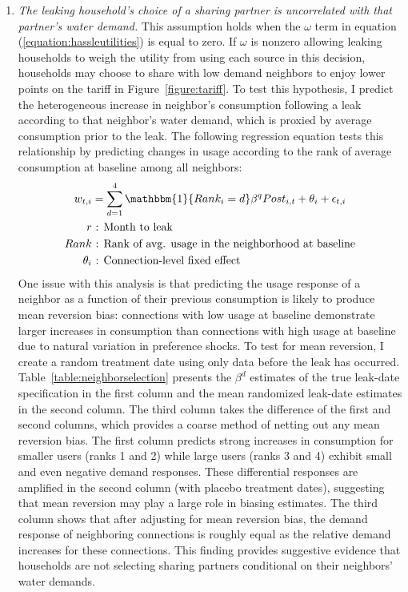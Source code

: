 \documentclass[12pt]{article}
\begin{document}
\begin{appendices}
\begin{enumerate}
	\item \textit{  The leaking household's choice of a sharing partner is uncorrelated with that partner's water demand.  }  This assumption holds when the $\omega$ term in equation (\ref{equation:hassleutilities}) is equal to zero.  If $\omega$ is nonzero allowing leaking households to weigh the utility from using each source in this decision, households may choose to share with low demand neighbors to enjoy lower points on the tariff in Figure~\ref{figure:tariff}.  To test this hypothesis, I predict the heterogeneous increase in neighbor's consumption following a leak according to that neighbor's water demand, which is proxied by average consumption prior to the leak.  The following regression equation tests this relationship by predicting changes in usage according to the rank of average consumption at baseline among all neighbors: 
\begin{align*}
	w_{t,i} &= \sum_{d=1}^{4} \mathbbm{1}\{Rank_{i}=d\}  \beta^{q} Post_{i,t}  + \theta_{i}  + \epsilon_{t,i}\\
r &\text{ : Month to leak} \\
Rank &\text{ : Rank of avg. usage in the neighborhood at baseline} \\
\theta_i &\text{ : Connection-level fixed effect}
\end{align*}
	One issue with this analysis is that predicting the usage response of a neighbor as a function of their previous consumption is likely to produce mean reversion bias: connections with low usage at baseline demonstrate larger increases in consumption than connections with high usage at baseline due to natural variation in preference shocks.  To test for mean reversion, I create a random treatment date using only data before the leak has occurred.  Table~\ref{table:neighborselection} presents the $\beta^{d}$ estimates of the true leak-date specification in the first column and the mean randomized leak-date estimates in the second column.  The third column takes the difference of the first and second columns, which provides a coarse method of netting out any mean reversion bias.  The first column predicts strong increases in consumption for smaller users (ranks 1 and 2) while large users (ranks 3 and 4) exhibit small and even negative demand responses.  These differential responses are amplified in the second column (with placebo treatment dates), suggesting that mean reversion may play a large role in biasing estimates.  The third column shows that after adjusting for mean reversion bias, the demand response of neighboring connections is roughly equal as the relative demand increases for these connections.  This finding provides suggestive evidence that households are not selecting sharing partners conditional on their neighbors' water demands.

\end{enumerate}
\end{appendices}
\end{document}
